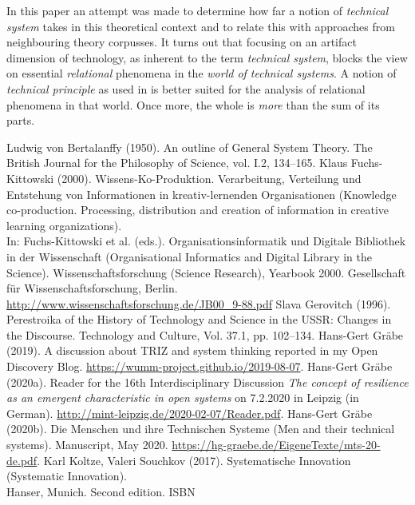\documentclass{llncs}
\begin{document}
In this paper an attempt was made to determine how far a notion of
\emph{technical system} takes in this theoretical context and to relate this
with approaches from neighbouring theory corpusses.  It turns out that
focusing on an artifact dimension of technology, as inherent to the term
\emph{technical system}, blocks the view on essential \emph{relational}
phenomena in the \emph{world of technical systems}. A notion of
\emph{technical principle} as used in \cite{Shpakovsky2010} is better suited
for the analysis of relational phenomena in that world. Once more, the whole
is \emph{more} than the sum of its parts.

\begin{thebibliography}{xxx}
 Ludwig von Bertalanffy (1950). An outline of General
  System Theory. The British Journal for the Philosophy of Science, vol. I.2,
  134–165.
 Klaus Fuchs-Kittowski (2000).  Wissens-Ko-Produktion.
  Verarbeitung, Verteilung und Entstehung von Informationen in
  kreativ-lernenden Organisationen (Knowledge co-production. Processing,
  distribution and creation of information in creative learning
  organizations).\\ In: Fuchs-Kittowski et al. (eds.). Organisationsinformatik
  und Digitale Bibliothek in der Wissenschaft (Organisational Informatics and
  Digital Library in the Science). Wissenschaftsforschung (Science Research),
  Yearbook 2000. Gesellschaft für Wissenschaftsforschung, Berlin.
  \url{http://www.wissenschaftsforschung.de/JB00_9-88.pdf}
 Slava Gerovitch (1996). Perestroika of the History of
  Technology and Science in the USSR: Changes in the Discourse. Technology and
  Culture, Vol. 37.1, pp. 102--134.
 Hans-Gert Gräbe (2019). A discussion about TRIZ and
  system thinking reported in my Open Discovery Blog.
  \url{https://wumm-project.github.io/2019-08-07}. 
 Hans-Gert Gräbe (2020a). Reader for the 16th
  Interdisciplinary Discussion \emph{The concept of resilience as an emergent
    characteristic in open systems} on 7.2.2020 in Leipzig (in German).
  \url{http://mint-leipzig.de/2020-02-07/Reader.pdf}.
 Hans-Gert Gräbe (2020b). Die Menschen und ihre
  Technischen Systeme (Men and their technical systems). Manuscript, May 2020.
  \url{https://hg-graebe.de/EigeneTexte/mts-20-de.pdf}.
 Karl Koltze, Valeri Souchkov (2017). Systematische Innovation
  (Systematic Innovation).\\ Hanser, Munich. Second edition. ISBN

\end{thebibliography}
\end{document}
